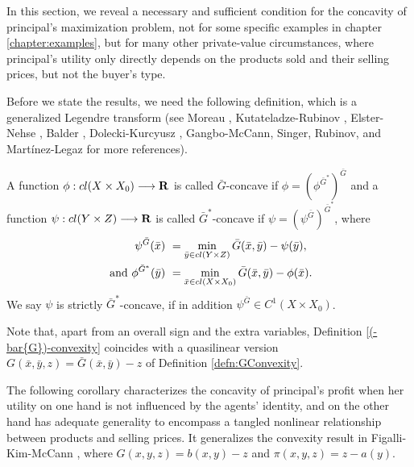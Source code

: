 In this section, we reveal a necessary and sufficient condition  for the concavity of principal's maximization problem, not for some specific examples in chapter \ref{chapter:examples}, but for many other private-value circumstances, where principal's utility only directly depends on the products sold and their selling prices, but not the buyer's type. 
\medskip


	Before we state the results, we need the following definition, which is a generalized Legendre transform 
	(see Moreau \cite{Moreau70}, Kutateladze-Rubinov \cite{KutateladzeRubinov72}, Elster-Nehse \cite{ElsterNehse74}, Balder \cite{Balder77}, Dolecki-Kurcyusz \cite{DoleckiKurcyusz78}, Gangbo-McCann\cite{GangboMcCann96}, Singer\cite{Singer97}, Rubinov\cite{Rubinov00a, Rubinov00b}, and Mart\'inez-Legaz \cite{MartinezLegaz05} 
	for more references).  
	\medskip
	
	
	
	\begin{definition}\label{(-bar{G})-convexity}
		A function $\phi: cl(X \times X_0) \longrightarrow {\mathbf R}$ is called $\bar{G}$-concave if $\phi = (\phi^{\bar{G}^*})^{\bar{G}}$ and a function $\psi: cl( Y \times Z) \longrightarrow {\mathbf R}$ is called $\bar{G}^*$-concave if $\psi = (\psi^{\bar{G}})^{\bar{G}^*}$, where 
		\begin{equation}\label{(-bar{G})-transform}
		\begin{split}
		\psi^{\bar{G}}(\bar{x})&~=\min_{\bar{y} \in cl( Y \times Z)} \bar{G}(\bar{x},\bar{y}) - \psi(\bar{y}),\\ \text{ and } \phi^{\bar{G}^*}(\bar{y})&~= \min_{\bar{x} \in cl(X \times X_0)} \bar{G}(\bar{x}, \bar{y}) - \phi(\bar{x}).
		\end{split}
		\end{equation}
		We say $\psi$ is strictly $\bar{G}^*$-concave, if in addition $\psi^{\bar G} \in C^1(X\times X_0)$. 
	\end{definition}
	
	Note that,  apart from an overall sign and the extra variables,
	Definition \ref{(-bar{G})-convexity} coincides with a quasilinear version $G(\bar{x},\bar{y},z) = \bar{G}(\bar{x},\bar{y})-z$ of
	Definition \ref{defn:GConvexity}.
	\medskip
	
	
	The following corollary characterizes the concavity of principal's profit when her utility on one hand is not influenced by the agents' identity, and on the other hand has adequate generality to  encompass a
	tangled nonlinear relationship between products and selling prices. It generalizes the convexity result in Figalli-Kim-McCann \cite{FigalliKimMcCann11}, where $G(x,y,z) = b(x,y)-z$ and $\pi(x,y,z) = z-a(y)$. 
	\medskip
	
